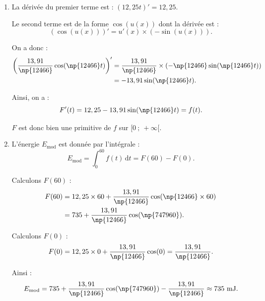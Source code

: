 \begin{enumerate}[start=6]
\item La dérivée du premier terme est :
$\left(12,25 t\right)' = 12,25.$

Le second terme est de la forme $\cos(u(x))$ dont la dérivée est :
\[(\cos(u(x)))' = u'(x) \times (-\sin(u(x))).\]

On a donc :
\begin{align*}
\left(\dfrac{13,91}{\np{12466}} \cos(\np{12466}t)\right)' &= \dfrac{13,91}{\np{12466}} \times (-\np{12466} \sin(\np{12466}t)) \\
&= -13,91 \sin(\np{12466}t).
\end{align*}

Ainsi, on a :
\[F'(t) = 12,25 - 13,91 \sin(\np{12466}t) = f(t).\]

$F$ est donc bien une primitive de $f$ sur $[0~;~+\infty[$.

\item L'énergie $E_{\text{mod}}$ est donnée par l'intégrale :
\[E_{\text{mod}} = \int_{0}^{60} f(t) \, \mathrm{d}t = F(60) - F(0).\]

Calculons $F(60)$ :
\begin{align*}
F(60) &= 12,25 \times 60 + \dfrac{13,91}{\np{12466}} \cos(\np{12466} \times 60) \\
&= 735 + \dfrac{13,91}{\np{12466}} \cos(\np{747960}).
\end{align*}

Calculons $F(0)$ :
\[F(0) = 12,25 \times 0 + \dfrac{13,91}{\np{12466}} \cos(0) = \dfrac{13,91}{\np{12466}}.\]

Ainsi :
\[E_{\text{mod}} = 735 + \dfrac{13,91}{\np{12466}} \cos(\np{747960}) - \dfrac{13,91}{\np{12466}} \approx 735 \text{ mJ}.\]
\end{enumerate}

\bigskip
